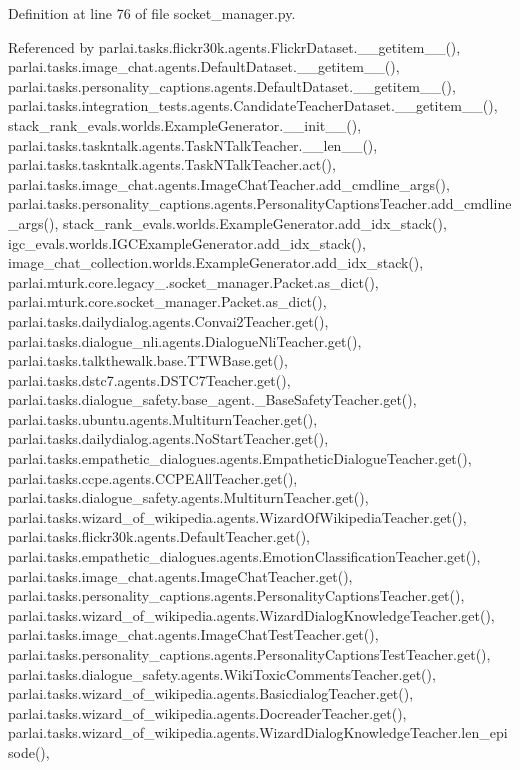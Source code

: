 Definition at line 76 of file socket\+\_\+manager.\+py.



Referenced by parlai.\+tasks.\+flickr30k.\+agents.\+Flickr\+Dataset.\+\_\+\+\_\+getitem\+\_\+\+\_\+(), parlai.\+tasks.\+image\+\_\+chat.\+agents.\+Default\+Dataset.\+\_\+\+\_\+getitem\+\_\+\+\_\+(), parlai.\+tasks.\+personality\+\_\+captions.\+agents.\+Default\+Dataset.\+\_\+\+\_\+getitem\+\_\+\+\_\+(), parlai.\+tasks.\+integration\+\_\+tests.\+agents.\+Candidate\+Teacher\+Dataset.\+\_\+\+\_\+getitem\+\_\+\+\_\+(), stack\+\_\+rank\+\_\+evals.\+worlds.\+Example\+Generator.\+\_\+\+\_\+init\+\_\+\+\_\+(), parlai.\+tasks.\+taskntalk.\+agents.\+Task\+N\+Talk\+Teacher.\+\_\+\+\_\+len\+\_\+\+\_\+(), parlai.\+tasks.\+taskntalk.\+agents.\+Task\+N\+Talk\+Teacher.\+act(), parlai.\+tasks.\+image\+\_\+chat.\+agents.\+Image\+Chat\+Teacher.\+add\+\_\+cmdline\+\_\+args(), parlai.\+tasks.\+personality\+\_\+captions.\+agents.\+Personality\+Captions\+Teacher.\+add\+\_\+cmdline\+\_\+args(), stack\+\_\+rank\+\_\+evals.\+worlds.\+Example\+Generator.\+add\+\_\+idx\+\_\+stack(), igc\+\_\+evals.\+worlds.\+I\+G\+C\+Example\+Generator.\+add\+\_\+idx\+\_\+stack(), image\+\_\+chat\+\_\+collection.\+worlds.\+Example\+Generator.\+add\+\_\+idx\+\_\+stack(), parlai.\+mturk.\+core.\+legacy\+\_.\+socket\+\_\+manager.\+Packet.\+as\+\_\+dict(), parlai.\+mturk.\+core.\+socket\+\_\+manager.\+Packet.\+as\+\_\+dict(), parlai.\+tasks.\+dailydialog.\+agents.\+Convai2\+Teacher.\+get(), parlai.\+tasks.\+dialogue\+\_\+nli.\+agents.\+Dialogue\+Nli\+Teacher.\+get(), parlai.\+tasks.\+talkthewalk.\+base.\+T\+T\+W\+Base.\+get(), parlai.\+tasks.\+dstc7.\+agents.\+D\+S\+T\+C7\+Teacher.\+get(), parlai.\+tasks.\+dialogue\+\_\+safety.\+base\+\_\+agent.\+\_\+\+Base\+Safety\+Teacher.\+get(), parlai.\+tasks.\+ubuntu.\+agents.\+Multiturn\+Teacher.\+get(), parlai.\+tasks.\+dailydialog.\+agents.\+No\+Start\+Teacher.\+get(), parlai.\+tasks.\+empathetic\+\_\+dialogues.\+agents.\+Empathetic\+Dialogue\+Teacher.\+get(), parlai.\+tasks.\+ccpe.\+agents.\+C\+C\+P\+E\+All\+Teacher.\+get(), parlai.\+tasks.\+dialogue\+\_\+safety.\+agents.\+Multiturn\+Teacher.\+get(), parlai.\+tasks.\+wizard\+\_\+of\+\_\+wikipedia.\+agents.\+Wizard\+Of\+Wikipedia\+Teacher.\+get(), parlai.\+tasks.\+flickr30k.\+agents.\+Default\+Teacher.\+get(), parlai.\+tasks.\+empathetic\+\_\+dialogues.\+agents.\+Emotion\+Classification\+Teacher.\+get(), parlai.\+tasks.\+image\+\_\+chat.\+agents.\+Image\+Chat\+Teacher.\+get(), parlai.\+tasks.\+personality\+\_\+captions.\+agents.\+Personality\+Captions\+Teacher.\+get(), parlai.\+tasks.\+wizard\+\_\+of\+\_\+wikipedia.\+agents.\+Wizard\+Dialog\+Knowledge\+Teacher.\+get(), parlai.\+tasks.\+image\+\_\+chat.\+agents.\+Image\+Chat\+Test\+Teacher.\+get(), parlai.\+tasks.\+personality\+\_\+captions.\+agents.\+Personality\+Captions\+Test\+Teacher.\+get(), parlai.\+tasks.\+dialogue\+\_\+safety.\+agents.\+Wiki\+Toxic\+Comments\+Teacher.\+get(), parlai.\+tasks.\+wizard\+\_\+of\+\_\+wikipedia.\+agents.\+Basicdialog\+Teacher.\+get(), parlai.\+tasks.\+wizard\+\_\+of\+\_\+wikipedia.\+agents.\+Docreader\+Teacher.\+get(), parlai.\+tasks.\+wizard\+\_\+of\+\_\+wikipedia.\+agents.\+Wizard\+Dialog\+Knowledge\+Teacher.\+len\+\_\+episode(), 